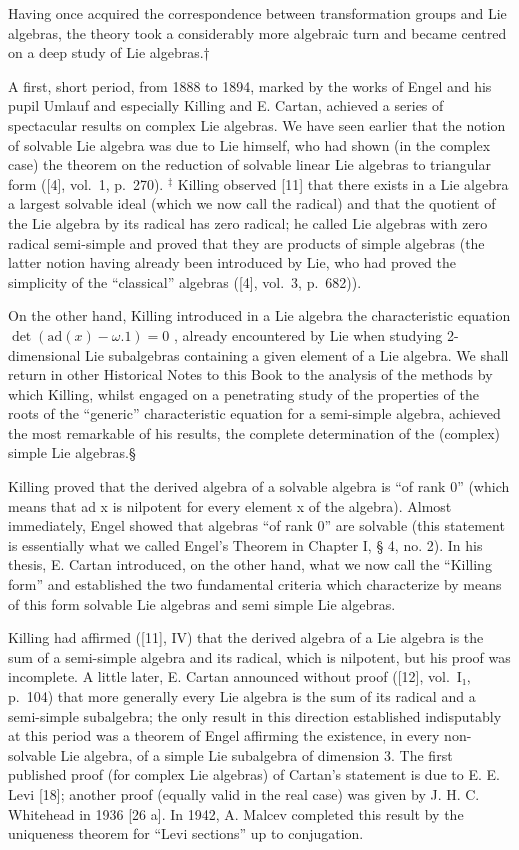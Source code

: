 
Having once acquired the correspondence between transformation groups and Lie algebras, the theory took a considerably more algebraic turn and became centred on a deep study of Lie algebras.†

A first, short period, from 1888 to 1894, marked by the works of Engel and his pupil Umlauf and especially Killing and E. Cartan, achieved a series of spectacular results on complex Lie algebras. We have seen earlier that the notion of solvable Lie algebra was due to Lie himself, who had shown (in the complex case) the theorem on the reduction of solvable linear Lie algebras to triangular form ({[}4{]}, vol.~1, p.~270). \(^{\ddagger}\) Killing observed {[}11{]} that there exists in a Lie algebra a largest solvable ideal (which we now call the radical) and that the quotient of the Lie algebra by its radical has zero radical; he called Lie algebras with zero radical semi-simple and proved that they are products of simple algebras (the latter notion having already been introduced by Lie, who had proved the simplicity of the ``classical'' algebras ({[}4{]}, vol.~3, p.~682)).

On the other hand, Killing introduced in a Lie algebra the characteristic equation \(\det(\mathrm{ad}(x)-\omega.1)=0\) , already encountered by Lie when studying 2-dimensional Lie subalgebras containing a given element of a Lie algebra. We shall return in other Historical Notes to this Book to the analysis of the methods by which Killing, whilst engaged on a penetrating study of the properties of the roots of the ``generic'' characteristic equation for a semi-simple algebra, achieved the most remarkable of his results, the complete determination of the (complex) simple Lie algebras.§

Killing proved that the derived algebra of a solvable algebra is ``of rank 0'' (which means that ad x is nilpotent for every element x of the algebra). Almost immediately, Engel showed that algebras ``of rank 0'' are solvable (this statement is essentially what we called Engel's Theorem in Chapter I, § 4, no. 2). In his thesis, E. Cartan introduced, on the other hand, what we now call the ``Killing form'' and established the two fundamental criteria which characterize by means of this form solvable Lie algebras and semi simple Lie algebras.

Killing had affirmed ({[}11{]}, IV) that the derived algebra of a Lie algebra is the sum of a semi-simple algebra and its radical, which is nilpotent, but his proof was incomplete. A little later, E. Cartan announced without proof ({[}12{]}, vol.~I₁, p.~104) that more generally every Lie algebra is the sum of its radical and a semi-simple subalgebra; the only result in this direction established indisputably at this period was a theorem of Engel affirming the existence, in every non-solvable Lie algebra, of a simple Lie subalgebra of dimension 3. The first published proof (for complex Lie algebras) of Cartan's statement is due to E. E. Levi {[}18{]}; another proof (equally valid in the real case) was given by J. H. C. Whitehead in 1936 {[}26 a{]}. In 1942, A. Malcev completed this result by the uniqueness theorem for ``Levi sections'' up to conjugation.


